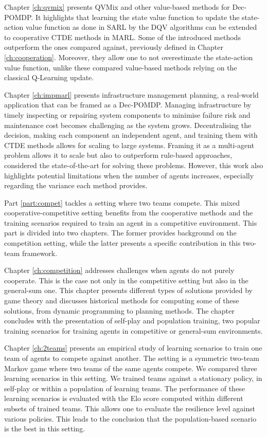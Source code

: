Chapter \ref{ch:qvmix} presents QVMix and other value-based methods for Dec-POMDP.
It highlights that learning the state value function to update the state-action value function as done in SARL by the DQV algorithms can be extended to cooperative CTDE methods in MARL.
Some of the introduced methods outperform the ones compared against, previously defined in Chapter \ref{ch:cooperation}.
Moreover, they allow one to not overestimate the state-action value function, unlike these compared value-based methods relying on the classical Q-Learning update.

Chapter \ref{ch:impmarl} presents infrastructure management planning, a real-world application that can be framed as a Dec-POMDP.
Managing infrastructure by timely inspecting or repairing system components to minimise failure risk and maintenance cost becomes challenging as the system grows.
Decentralising the decision, making each component an independent agent, and training them with CTDE methods allows for scaling to large systems.
Framing it as a multi-agent problem allows it to scale but also to outperform rule-based approaches, considered the state-of-the-art for solving these problems.
However, this work also highlights potential limitations when the number of agents increases, especially regarding the variance each method provides.

Part \ref{part:compet} tackles a setting where two teams compete.
This mixed cooperative-competitive setting benefits from the cooperative methods and the training scenarios required to train an agent in a competitive environment.
This part is divided into two chapters.
The former provides background on the competition setting, while the latter presents a specific contribution in this two-team framework.

Chapter \ref{ch:competition} addresses challenges when agents do not purely cooperate.
This is the case not only in the competitive setting but also in the general-sum one.
This chapter presents different types of solutions provided by game theory and discusses historical methods for computing some of these solutions, from dynamic programming to planning methods.
The chapter concludes with the presentation of self-play and population training, two popular training scenarios for training agents in competitive or general-sum environments.

Chapter \ref{ch:2teams} presents an empirical study of learning scenarios to train one team of agents to compete against another.
The setting is a symmetric two-team Markov game where two teams of the same agents compete.
We compared three learning scenarios in this setting.
We trained teams against a stationary policy, in self-play or within a population of learning teams.
The performance of these learning scenarios is evaluated with the Elo score computed within different subsets of trained teams.
This allows one to evaluate the resilience level against various policies.
This leads to the conclusion that the population-based scenario is the best in this setting.

